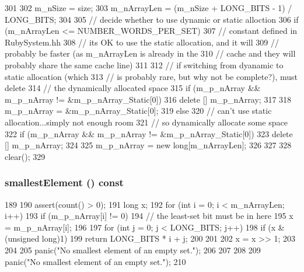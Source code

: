 \begin{DoxyCode}
301 {
302     m_nSize = size;
303     m_nArrayLen = (m_nSize + LONG_BITS - 1) / LONG_BITS;
304 
305     // decide whether to use dynamic or static alloction
306     if (m_nArrayLen <= NUMBER_WORDS_PER_SET) {
307         // constant defined in RubySystem.hh
308         // its OK to use the static allocation, and it will
309         // probably be faster (as m_nArrayLen is already in the
310         // cache and they will probably share the same cache line)
311 
312         // if switching from dyanamic to static allocation (which
313         // is probably rare, but why not be complete?), must delete
314         // the dynamically allocated space
315         if (m_p_nArray && m_p_nArray != &m_p_nArray_Static[0])
316             delete [] m_p_nArray;
317 
318         m_p_nArray = &m_p_nArray_Static[0];
319     } else {
320         // can't use static allocation...simply not enough room
321         // so dynamically allocate some space
322         if (m_p_nArray && m_p_nArray != &m_p_nArray_Static[0])
323             delete [] m_p_nArray;
324 
325         m_p_nArray = new long[m_nArrayLen];
326     }
327 
328     clear();
329 }
\end{DoxyCode}
\hypertarget{classSet_a0df0ef450758d1afd49a460353d702da}{
\subsubsection[{smallestElement}]{ smallestElement () const}}
\label{classSet_a0df0ef450758d1afd49a460353d702da}



\begin{DoxyCode}
189 {
190     assert(count() > 0);
191     long x;
192     for (int i = 0; i < m_nArrayLen; i++) {
193         if (m_p_nArray[i] != 0) {
194             // the least-set bit must be in here
195             x = m_p_nArray[i];
196 
197             for (int j = 0; j < LONG_BITS; j++) {
198                 if (x & (unsigned long)1) {
199                     return LONG_BITS * i + j;
200                 }
201 
202                 x = x >> 1;
203             }
204 
205             panic("No smallest element of an empty set.");
206         }
207     }
208 
209     panic("No smallest element of an empty set.");
210 }
\end{DoxyCode}


